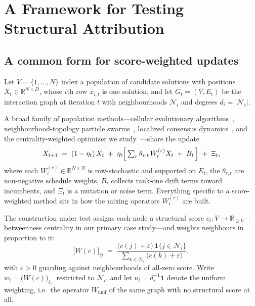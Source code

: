\section{A Framework for Testing Structural Attribution}
\label{sec:method}

\subsection{A common form for score-weighted updates}
\label{sec:form}

Let $V=\{1,\dots,N\}$ index a population of candidate solutions with positions
$X_t \in \mathbb{R}^{N \times D}$, whose $i$th row $x_{i,t}$ is one solution,
and let $G_t=(V,E_t)$ be the interaction graph at iteration $t$ with
neighbourhoods $\mathcal{N}_i$ and degrees $d_i=|\mathcal{N}_i|$.

A broad family of population methods---cellular evolutionary
algorithms~\cite{alba2005exploration}, neighbourhood-topology particle
swarms~\cite{kennedy2002population}, localized consensus
dynamics~\cite{bungert2024polarized}, and the centrality-weighted optimizer we
study~\cite{jalali2026social}---share the update
%
\begin{equation}
\label{eq:master}
X_{t+1} \;=\; (1-\eta_t)\,X_t \;+\; \eta_t\Bigl[\, \textstyle\sum_{r} \theta_{r,t}\, W^{(r)}_t X_t \;+\; B_t \,\Bigr] \;+\; \Xi_t ,
\end{equation}
%
where each $W^{(r)}_t \in \mathbb{R}^{N\times N}$ is row-stochastic and
supported on $E_t$, the $\theta_{r,t}$ are non-negative schedule weights,
$B_t$ collects rank-one drift terms toward incumbents, and $\Xi_t$ is a
mutation or noise term. Everything specific to a score-weighted method sits
in how the mixing operators $W^{(r)}_t$ are built.

The construction under test assigns each node a structural score
$c_t : V \to \mathbb{R}_{\ge 0}$---betweenness centrality in our primary case
study---and weights neighbours in proportion to it:
%
\begin{equation}
\label{eq:W}
\bigl[W(c)\bigr]_{ij} \;=\;
\frac{\bigl(c(j)+\varepsilon\bigr)\,\mathbf{1}\{j \in \mathcal{N}_i\}}
     {\sum_{k \in \mathcal{N}_i}\bigl(c(k)+\varepsilon\bigr)} ,
\end{equation}
%
with $\varepsilon>0$ guarding against neighbourhoods of all-zero score. Write
$w_i = \bigl(W(c)\bigr)_{i,\cdot}$ restricted to $\mathcal{N}_i$, and let
$u_i = d_i^{-1}\mathbf{1}$ denote the uniform weighting, i.e.\ the operator
$W_{\mathrm{unif}}$ of the same graph with no structural score at all.

